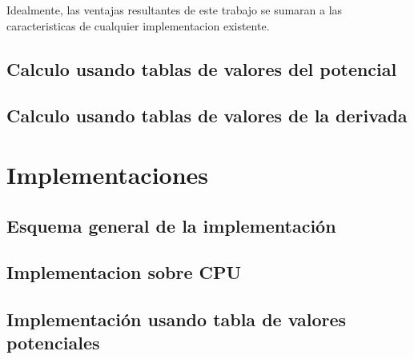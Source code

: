\documentclass[a4paper,10pt]{report}
\begin{document}
Idealmente, las ventajas resultantes de este trabajo se sumaran a las caracteristicas de cualquier implementacion existente. 









\section{Calculo usando tablas de valores del potencial }





\section{Calculo usando tablas de valores de la derivada  }

\chapter{Implementaciones}

\section{Esquema general de la implementación}
\section{Implementacion sobre CPU}
\section{Implementación usando tabla de valores potenciales}
\end{document}
